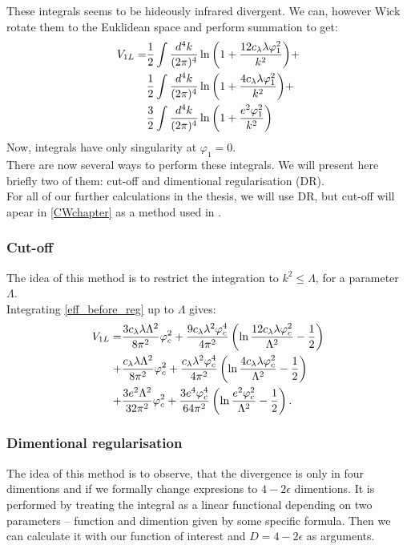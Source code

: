These integrals seems to be hideously infrared divergent. 
We can, however Wick rotate them to the Euklidean space and perform summation to get:
\begin{align}\label{eff_before_reg}
V_{1L}=&\frac{1}{2} \int\frac{d^4k}{(2\pi)^4}\ln{\left(1+\frac{12c_\lambda\lambda\varphi_1^2}{k^2}
\right)} +\\
&\frac{1}{2} \int\frac{d^4k}{(2\pi)^4}\ln{\left(1+\frac{4c_\lambda\lambda\varphi_1^2}{k^2}
\right)} +\\ 
&\frac{3}{2} \int\frac{d^4k}{(2\pi)^4}\ln{\left(1+\frac{e^2\varphi_1^2}{k^2}\right)}
\end{align}
Now, integrals have only singularity at $\varphi_1 = 0$. \\

There are now several ways to perform these integrals. We will present here briefly two of them: 
cut-off and
dimentional regularisation (DR). \\

For all of our further calculations in the thesis, we will use DR, 
but cut-off will apear in \ref{CWchapter} 
as a method used in \cite{Coleman1973}. \\
\subsubsection{Cut-off}
The idea of this method is to restrict the integration to $k^2 \leq \Lambda$, for a 
parameter $\Lambda$. \\

Integrating \ref{eff_before_reg} up to $\Lambda$ gives:
\begin{align}
V_{1L}=
&\frac{3c_\lambda\lambda\Lambda^2}{8\pi^2}\varphi_c^2+\frac{9c_\lambda\lambda^2\varphi_c^4}{4\pi^2}
\left(\ln\frac{12c_\lambda\lambda\varphi_c^2}{\Lambda^2}-\frac{1}{2}\right)  \notag \\
+&\frac{c_\lambda\lambda\Lambda^2}{8\pi^2}\varphi_c^2+\frac{c_\lambda\lambda^2\varphi_c^4}{4\pi^2}
\left(\ln\frac{4c_\lambda\lambda\varphi_c^2}{\Lambda^2}-\frac{1}{2}\right)  \notag \\
+&\frac{3e^2\Lambda^2}{32\pi^2}\varphi_c^2+\frac{3e^4\varphi_c^4}{64\pi^2}
\left(\ln\frac{e^2\varphi_c^2}{\Lambda^2}-\frac{1}{2}\right).
\end{align}

\subsubsection{Dimentional regularisation}
The idea of this method is to observe, that the divergence is only in four dimentions 
and if we formally change expresions to $4-2\epsilon$ dimentions. 
It is performed by treating the integral as a linear functional depending on two parameters --
function and dimention given by some specific formula. Then we can calculate it with our 
function of interest and $D = 4-2\epsilon$ as arguments.  \\

